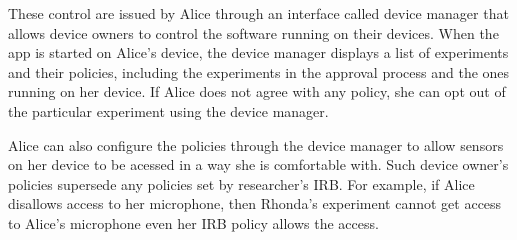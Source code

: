 

These control are issued by Alice through an interface called device manager that 
allows device owners to control the software running on their 
devices. 
When the \sysname app is started on Alice's device, the 
device manager displays a list of experiments and their policies, including 
the experiments in the approval process and the ones running on her device. If 
Alice does not agree with any policy, she can opt out of the particular 
experiment using the device manager. 

Alice can also configure the policies through the device manager to allow
sensors on her device to be acessed in a way she is comfortable with.
Such device owner's policies supersede any policies set by researcher's IRB. For 
example, if Alice disallows access to her microphone, then 
Rhonda's experiment cannot get access to Alice's microphone even
her IRB policy allows the access. 


